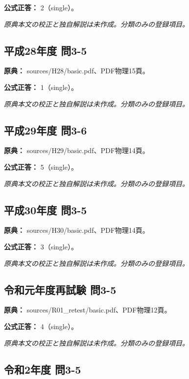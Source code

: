 \textbf{公式正答：} 2（single）。

\par\textit{原典本文の校正と独自解説は未作成。分類のみの登録項目。}

\subsection{平成28年度 問3-5}
\label{q:h28-reg-basic-3-5}

\noindent\textbf{原典：} sources/H28/basic.pdf、PDF物理15頁。

\textbf{公式正答：} 1（single）。

\par\textit{原典本文の校正と独自解説は未作成。分類のみの登録項目。}

\subsection{平成29年度 問3-6}
\label{q:h29-reg-basic-3-6}

\noindent\textbf{原典：} sources/H29/basic.pdf、PDF物理14頁。

\textbf{公式正答：} 5（single）。

\par\textit{原典本文の校正と独自解説は未作成。分類のみの登録項目。}

\subsection{平成30年度 問3-5}
\label{q:h30-reg-basic-3-5}

\noindent\textbf{原典：} sources/H30/basic.pdf、PDF物理14頁。

\textbf{公式正答：} 3（single）。

\par\textit{原典本文の校正と独自解説は未作成。分類のみの登録項目。}

\subsection{令和元年度再試験 問3-5}
\label{q:r01-ret-basic-3-5}

\noindent\textbf{原典：} sources/R01\_retest/basic.pdf、PDF物理12頁。

\textbf{公式正答：} 4（single）。

\par\textit{原典本文の校正と独自解説は未作成。分類のみの登録項目。}

\subsection{令和2年度 問3-5}
\label{q:r02-reg-basic-3-5}

